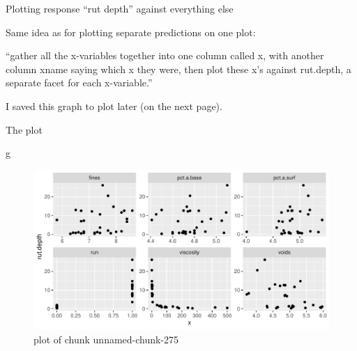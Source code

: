 \documentclass[ignorenonframetext,]{beamer}
\newenvironment{Shaded}{\begin{snugshade}}{\end{snugshade}}
\newcommand{\DataTypeTok}[1]{\textcolor[rgb]{0.13,0.29,0.53}{#1}}
\newcommand{\KeywordTok}[1]{\textcolor[rgb]{0.13,0.29,0.53}{\textbf{#1}}}
\newcommand{\NormalTok}[1]{#1}
\newcommand{\OperatorTok}[1]{\textcolor[rgb]{0.81,0.36,0.00}{\textbf{#1}}}
\newcommand{\StringTok}[1]{\textcolor[rgb]{0.31,0.60,0.02}{#1}}
\begin{document}
\begin{frame}[fragile]{Plotting response ``rut depth'' against
everything else}
\protect\hypertarget{plotting-response-rut-depth-against-everything-else}{}

Same idea as for plotting separate predictions on one plot:

\begin{Shaded}
\end{Shaded}

``gather all the x-variables together into one column called x, with
another column xname saying which x they were, then plot these x's
against rut.depth, a separate facet for each x-variable.''

I saved this graph to plot later (on the next page).

\end{frame}

\begin{frame}[fragile]{The plot}
\protect\hypertarget{the-plot-2}{}

\begin{Shaded}
\begin{Highlighting}[]
\NormalTok{g}
\end{Highlighting}
\end{Shaded}

\begin{figure}
\centering
\includegraphics{figure/unnamed-chunk-275-1.pdf}
\caption{plot of chunk unnamed-chunk-275}
\end{figure}

\end{frame}
\end{document}
